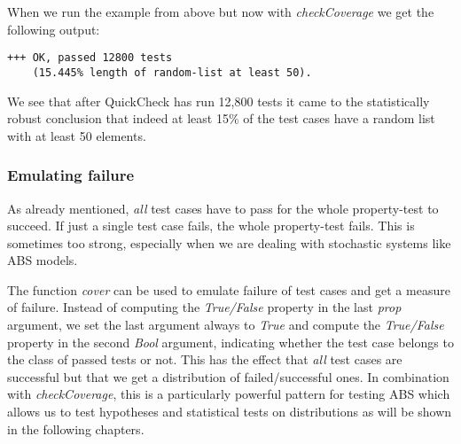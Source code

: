When we run the example from above but now with \textit{checkCoverage} we get the following output:

\begin{verbatim}
+++ OK, passed 12800 tests 
    (15.445% length of random-list at least 50).
\end{verbatim}

We see that after QuickCheck has run 12,800 tests it came to the statistically robust conclusion that indeed at least 15\% of the test cases have a random list with at least 50 elements. 

\subsubsection*{Emulating failure}
As already mentioned, \textit{all} test cases have to pass for the whole property-test to succeed. If just a single test case fails, the whole property-test fails. This is sometimes too strong, especially when we are dealing with stochastic systems like ABS models.

The function \textit{cover} can be used to emulate failure of test cases and get a measure of failure. Instead of computing the \textit{True/False} property in the last \textit{prop} argument, we set the last argument always to \textit{True} and compute the \textit{True/False} property in the second \textit{Bool} argument, indicating whether the test case belongs to the class of passed tests or not. This has the effect that \textit{all} test cases are successful but that we get a distribution of failed/successful ones. In combination with \textit{checkCoverage}, this is a particularly powerful pattern for testing ABS which allows us to test hypotheses and statistical tests on distributions as will be shown in the following chapters.